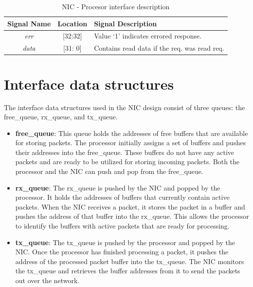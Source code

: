 \documentclass[12pt]{report}
\begin{document}
				\begin{table}[!htbp]
					\centering
					\begin{tabular}{ccl}
						\hline
						\textbf{Signal Name} 		& \textbf{Location} 		&\textbf{Signal Description}  \\ \hline
						\textit{err}			& [32:32]			& Value `1' indicates errored response.\\\hline
						\textit{data}   		& [31: 0] 			& Contains read data if the req. was read req.\\ \hline
					\end{tabular}
					\caption{ NIC - Procesor interface description}
					\label{tab:NIC-Proc-interface-resp}
				\end{table}

	
	\section{Interface data structures}

		The interface data structures used in the NIC design consist of three queues: the free\_queue, rx\_queue, and tx\_queue.




	\begin{itemize}
		\item \textbf{free\_queue}: This queue holds the addresses of free buffers that are available for storing packets. The processor initially assigns a set of buffers and pushes their addresses into the free\_queue. These buffers do not have any active packets and are ready to be utilized for storing incoming packets. Both the processor and the NIC can push and pop from the free\_queue.\\

		\item \textbf{rx\_queue}: The rx\_queue is pushed by the NIC and popped by the processor. It holds the addresses of buffers that currently contain active packets. When the NIC receives a packet, it stores the packet in a buffer and pushes the address of that buffer into the rx\_queue. This allows the processor to identify the buffers with active packets that are ready for processing.

		\item \textbf{tx\_queue}: The tx\_queue is pushed by the processor and popped by the NIC. Once the processor has finished processing a packet, it pushes the address of the processed packet buffer into the tx\_queue. The NIC monitors the tx\_queue and retrieves the buffer addresses from it to send the packets out over the network.\\
	\end{itemize}
\end{document}
